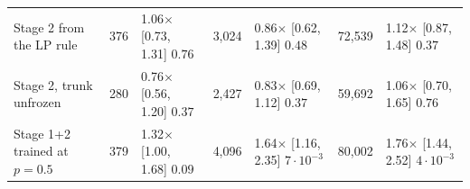 \begin{table}[t]
\begin{tabular}{lrlrlrl}
Stage 2 from the LP rule & 376 & 1.06$\times$ [0.73, 1.31] $0.76$ & 3,024 & 0.86$\times$ [0.62, 1.39] $0.48$ & 72,539 & 1.12$\times$ [0.87, 1.48] $0.37$ \\
Stage 2, trunk unfrozen & 280 & 0.76$\times$ [0.56, 1.20] $0.37$ & 2,427 & 0.83$\times$ [0.69, 1.12] $0.37$ & 59,692 & 1.06$\times$ [0.70, 1.65] $0.76$ \\
Stage 1+2 trained at $p=0.5$ & 379 & 1.32$\times$ [1.00, 1.68] $0.09$ & 4,096 & 1.64$\times$ [1.16, 2.35] $7\cdot10^{-3}$ & 80,002 & 1.76$\times$ [1.44, 2.52] $4\cdot10^{-3}$ \\
\bottomrule
\end{tabular}
\end{table}